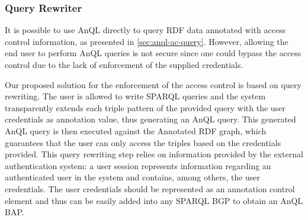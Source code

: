 \begin{comment}
  The previous rules were only rely on information present in the annotation values for the expansion. It is possible
  however, to consider cases where such application specific rules must rely on combining information present in the
  triple with information from the annotation value.  Consider for example the case where the RDF data contains also
  information regarding employee supervision: one rule might be to provide supervisors with access to the triples their
  subordinates are allowed to access:
  $$\frac{ \fuzzyg{\triple{X, \uri{{:}hasSupervisor}, Y}}{\lambda_{1}},\ \fuzzyg{\triple{S, P, O}}{\lambda_{2}},\ X \in
    \lambda_{2} }{ \fuzzyg{\triple{S, P, O}}{\mathit{extend}(\lambda_{2},X, Y)} } \enspace.$$
  In this case, the resulting annotation will not be a direct result of applying the $\otimes_{ac}$ or $\oplus_{ac}$
  functions but will also involve extending the original annotation with another element of the annotation
  elements~$\mathbb{ET}$, represented by the function $\mathit{extend}(\lambda,X, Y)$.
  To realise this rule, the domain must define the necessary functions:
  \begin{inparaenum}[(i)]
  \item $X \in \lambda$ consists of checking if the annotation element $X$ is included in the propositional formula
    $\lambda$; and
  \item $\mathit{extend}(\lambda,X, Y)$ replaces each occurrence of $X$ in $\lambda$ with $X \lor Y$ and performs the
    normalisation of the resulting annotation.
  \end{inparaenum}

\end{comment}




\subsubsection{Query Rewriter}


It is possible to use AnQL directly to query RDF data annotated with access control information, as presented in
\cref{sec:anql-ac-query}. However, allowing the end user to perform AnQL queries is not secure since one could bypass
the access control due to the lack of enforcement of the supplied credentials.

Our proposed solution for the enforcement of the access control is based on query rewriting.  The user is allowed to
write SPARQL queries and the system transparently extends each triple pattern of the provided query with the user
credentials as annotation value, thus generating an AnQL query.  This generated AnQL query is then executed against the
Annotated RDF graph, which guarantees that the user can only access the triples based on the credentials provided.
%
This query rewriting step relies on information provided by the external authentication system: a user session
represents information regarding an authenticated user in the system and contains, among others, the user credentials.
%
The user credentials should be represented as an annotation control element and thus can be easily added into any SPARQL
\ac{BGP} to obtain an AnQL \ac{BAP}.
%






